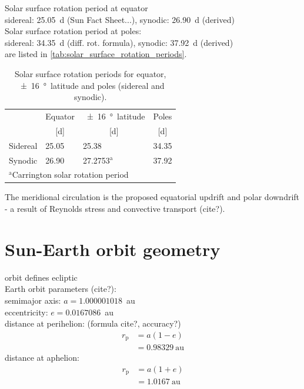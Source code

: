 Solar surface rotation period at equator\\
sidereal: 25.05~d (Sun Fact Sheet...), synodic: 26.90~d (derived)\\
Solar surface rotation period at poles:\\
sidereal: 34.35~d (diff. rot. formula), synodic: 37.92~d (derived)\\
are listed in \autoref{tab:solar_surface_rotation_periods}.\\
\begin{table}[htb]\small
	\centering
	\captionsetup{belowskip=4pt}
	\caption{Solar surface rotation periods for equator, \SI{+-16}{\degree}~latitude and poles (sidereal and synodic).}
	\begin{tabular}{llll}
		\toprule
				&Equator	&\SI{+-16}{\degree}~latitude	&Poles\\
				&\multicolumn{1}{c}{[d]}	&\multicolumn{1}{c}{[d]}	&\multicolumn{1}{c}{[d]}\\
		\midrule
		Sidereal	&25.05	&25.38	&34.35\\
		Synodic	&26.90	&27.2753$^\text{a}$	&37.92\\
		\bottomrule
		\multicolumn{4}{l}{\footnotesize{$^\text{a}$Carrington solar rotation period}}
	\end{tabular}
	\label{tab:solar_surface_rotation_periods}
\end{table}



The meridional circulation is the proposed equatorial updrift and polar downdrift - a result of Reynolds stress and convective transport (cite?).\\


\section{Sun-Earth orbit geometry}
\label{sec:sun_earth_orbit_geometry}

orbit defines ecliptic\\

Earth orbit parameters (cite?):\\
semimajor axis: $a = 1.000001018$~au\\
eccentricity: $e = 0.0167086$~au\\
distance at perihelion: (formula cite?, accuracy?)\\
\begin{align}
	r_\text{p} &= a (1 - e)\\
		&= 0.98329~\text{au}	\nonumber
\end{align}
distance at aphelion:\\
\begin{align}
	r_\text{p} &= a (1 + e)\\
		&= 1.0167~\text{au}	\nonumber
\end{align}

